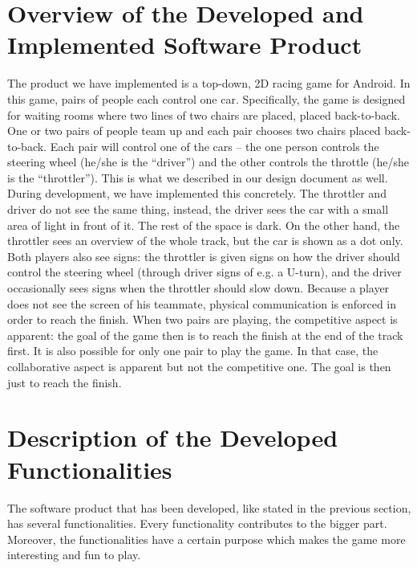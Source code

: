 \documentclass[11pt,twoside,a4paper]{article}
\begin{document}
\newpage

\section{Overview of the Developed and Implemented Software Product}
\label{sec:Overview}
The product we have implemented is a top-down, 2D racing game for Android. In this game, pairs of people each control one car. Specifically, the game is designed for waiting rooms where two lines of two chairs are placed, placed back-to-back. One or two pairs of people team up and each pair chooses two chairs placed back-to-back. Each pair will control one of the cars – the one person controls the steering wheel (he/she is the “driver”) and the other controls the throttle (he/she is the “throttler”).
\newline\newline
This is what we described in our design document as well. During development, we have implemented this concretely. The throttler and driver do not see the same thing, instead, the driver sees the car with a small area of light in front of it. The rest of the space is dark. On the other hand, the throttler sees an overview of the whole track, but the car is shown as a dot only. Both players also see signs: the throttler is given signs on how the driver should control the steering wheel (through driver signs of e.g. a U-turn), and the driver occasionally sees signs when the throttler should slow down. Because a player does not see the screen of his teammate, physical communication is enforced in order to reach the finish.
\newline\newline
When two pairs are playing, the competitive aspect is apparent: the goal of the game then is to reach the finish at the end of the track first. It is also possible for only one pair to play the game. In that case, the collaborative aspect is apparent but not the competitive one. The goal is then just to reach the finish.

\newpage

\section{Description of the Developed Functionalities}
The software product that has been developed, like stated in the previous section, has several functionalities. Every functionality contributes to the bigger part. Moreover, the functionalities have a certain purpose which makes the game more interesting and fun to play. \\
\end{document}
